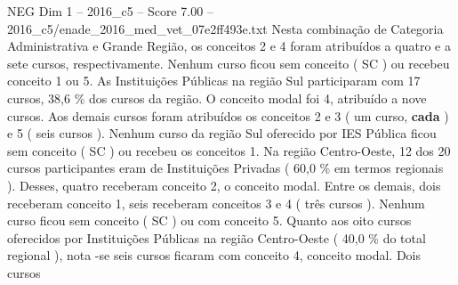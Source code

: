 \begin{textsample}{NEG Dim 1 – 2016\_c5 – Score 7.00 – 2016\_c5/enade\_2016\_med\_vet\_07e2ff493e.txt}
Nesta combinação de Categoria Administrativa e Grande Região, os conceitos 2 e 4 foram atribuídos a quatro e a sete cursos, respectivamente.
Nenhum curso ficou sem conceito ( SC ) ou recebeu conceito 1 ou 5.
As Instituições Públicas na região Sul participaram com 17 cursos, 38,6 \% dos cursos da região.
O conceito modal foi 4, atribuído a nove cursos.
Aos demais cursos foram atribuídos os conceitos 2 e 3 ( um curso, \textbf{cada} ) e 5 ( seis cursos ).
Nenhum curso da região Sul oferecido por IES Pública ficou sem conceito ( SC ) ou recebeu os conceitos 1.
Na região Centro-Oeste, 12 dos 20 cursos participantes eram de Instituições Privadas ( 60,0 \% em termos regionais ).
Desses, quatro receberam conceito 2, o conceito modal.
Entre os demais, dois receberam conceito 1, seis receberam conceitos 3 e 4 ( três cursos ).
Nenhum curso ficou sem conceito ( SC ) ou com conceito 5.
Quanto aos oito cursos oferecidos por Instituições Públicas na região Centro-Oeste ( 40,0 \% do total regional ), nota -se seis cursos ficaram com conceito 4, conceito modal.
Dois cursos

\end{textsample}
